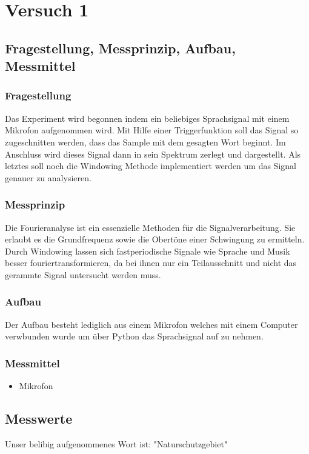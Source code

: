 \chapter{Versuch 1}
\label{chap:VERSUCH_1}


\section{Fragestellung, Messprinzip, Aufbau, Messmittel}
\label{chap:VERSUCH_1_FRAGESTELLUNG}

\subsection*{Fragestellung}
Das Experiment wird begonnen indem ein beliebiges Sprachsignal mit einem Mikrofon aufgenommen wird.
Mit Hilfe einer Triggerfunktion soll das Signal so zugeschnitten werden, dass das Sample mit dem gesagten Wort beginnt.
Im Anschluss wird dieses Signal dann in sein Spektrum zerlegt und dargestellt.
Als letztes soll noch die Windowing Methode implementiert werden um das Signal genauer zu analysieren.


\subsection*{Messprinzip}
Die Fourieranalyse ist ein essenzielle Methoden für die Signalverarbeitung. Sie erlaubt es die Grundfrequenz sowie die Obertöne einer Schwingung zu ermitteln.
Durch Windowing lassen sich fastperiodische Signale wie Sprache und Musik besser fouriertransformieren, da bei ihnen nur ein Teilausschnitt und nicht das gerammte Signal untersucht werden muss.

\subsection*{Aufbau}
Der Aufbau besteht lediglich aus einem Mikrofon welches mit einem Computer verwbunden wurde um über Python das Sprachsignal auf zu nehmen.


\subsection*{Messmittel}
\begin{itemize}
	\item Mikrofon
\end{itemize}

\section{Messwerte}
\label{chap:VERSUCH_1_MESSWERTE}
Unser belibig aufgenommenes Wort ist: "Naturschutzgebiet"

